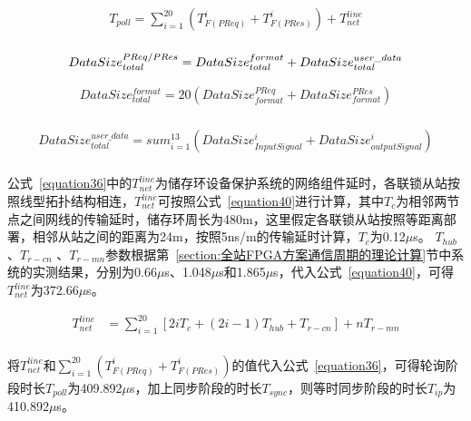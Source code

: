 \begin{equation}
\begin{split}
\label{equation36}
T_{poll}=\sum_{i=1}^{20}(T_{F(PReq)}^{i}+T_{F(PRes)}^{i})+T_{net}^{line}\\
\end{split}
\end{equation}


\begin{equation}
\label{equation37}
DataSize_{total}^{PReq/PRes} = DataSize_{total}^{format}+DataSize_{total}^{user\_data}\\
\end{equation}

\begin{equation}
\begin{split}
\label{equation38}
DataSize_{total}^{format} = 20(DataSize_{format}^{PReq}+DataSize_{format}^{PRes})\\
\end{split}
\end{equation}

\begin{equation}
\begin{split}
\label{equation39}
DataSize_{total}^{user\_data} = sum_{i=1}^{13}(DataSize_{InputSignal}^{i}+DataSize_{outputSignal}^{i})\\
\end{split}
\end{equation}

公式~\ref{equation36}中的$T_{net}^{line}$为储存环设备保护系统的网络组件延时，各联锁从站按照线型拓扑结构相连，$T_{net}^{line}$可按照公式~\ref{equation40}进行计算，其中$T_{c}$为相邻两节点之间网线的传输延时，储存环周长为480m，这里假定各联锁从站按照等距离部署，相邻从站之间的距离为24m，按照5ns/m的传输延时计算，$T_{c}$为0.12$\mu$s。 $T_{hub}$ 、$T_{r-cn}$ 、$T_{r-mn}$参数根据第~\ref{section:全站FPGA方案通信周期的理论计算}节中系统的实测结果，分别为0.66$\mu$s、1.048$\mu$s和1.865$\mu$s，代入公式~\ref{equation40}，可得$T_{net}^{line}$为372.66$\mu$s。

\begin{equation}
\begin{split}
\label{equation40}
T_{net}^{line}&=\sum_{i=1}^{20}[2iT_{c}+(2i-1)T_{hub}+T_{r-cn}]+nT_{r-mn}\\
\end{split}
\end{equation}

将$T_{net}^{line}$和$\sum_{i=1}^{20}(T_{F(PReq)}^{i}+T_{F(PRes)}^{i})$的值代入公式~\ref{equation36}，可得轮询阶段时长$T_{poll}$为409.892$\mu$s，加上同步阶段的时长$T_{sync}$，则等时同步阶段的时长$T_{ip}$为410.892$\mu$s。

